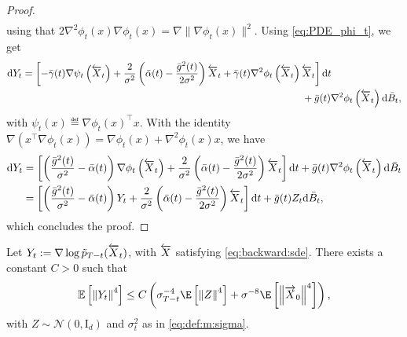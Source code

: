 \documentclass[english,graybox,envcountchap,envcountsame,sectrefs,shortlabels]{svmono}
\theoremstyle{style}
\newcommand{\eqsp}{}
\begin{document}
\begin{proof}
\begin{align*}
\end{align*}
using that $ 2 \nabla^2 \phi_t(x)  \nabla \phi_t(x) = \nabla \| \nabla \phi_t(x) \|^2$. Using \eqref{eq:PDE_phi_t}, we get
\begin{align*}
\rmd  Y_t &=
\left[
    - \bar\gamma(t)\nabla \psi_t\left(\ola X_t\right)  
        + \frac{2}{\sigma^2}\left( \bar \alpha(t) - \frac{\bar g^2(t)}{2 \sigma^2} \right)  \ola X_t
    + \bar\gamma(t) \nabla^2 \phi_t\left(\ola X_t\right) \ola X_t
\right]\rmd t \\
&\qquad\qquad\qquad\qquad\qquad\qquad
\qquad\qquad\qquad\qquad\qquad
\qquad\qquad\qquad+ \bar g(t) \nabla^2 \phi_t\left(\ola X_t\right) \rmd \bar B_t\eqsp,
\end{align*}
with $\psi_t\left(x\right) \eqdef \nabla \phi_t(x)^\top x$. With the identity $\nabla \left( x^\top \nabla \phi_t(x) \right) = \nabla \phi_t (x) + \nabla^2 \phi_t(x) x$, we have
\begin{align*}
\rmd  Y_t &=
\left[
    \left( \frac{\bar g^2(t)}{\sigma^2 } - \bar \alpha(t) \right)\nabla \phi_t\left(\ola X_t\right)
        + \frac{2}{\sigma^2}\left( \bar \alpha(t) - \frac{\bar g^2(t)}{2 \sigma^2} \right)  \ola X_t
\right]\rmd t + \bar g(t) \nabla^2 \phi_t\left(\ola X_t\right) \rmd \bar B_t
\\
&=
\left[
    \left( \frac{\bar g^2(t)}{\sigma^2 } - \bar \alpha(t) \right)Y_t
        + \frac{2}{\sigma^2}\left( \bar \alpha(t) - \frac{\bar g^2(t)}{2 \sigma^2} \right)  \ola X_t
\right]\rmd t + \bar g(t) Z_t \rmd \bar B_t\eqsp,
\end{align*}
which concludes the proof.
\end{proof}


\begin{lemma} \label{score moment bound }
Let $Y_t := \nabla \log \tilde p_{T-t} ( \overleftarrow X_t )$, with $\overleftarrow X$ satisfying \eqref{eq:backward:sde}. There exists a constant $C>0$ such that
\begin{align}\label{eq:moment4_Y}
\mathbb{E} \left[ \left\| Y_t \right\|^4 \right] \leq C \left(
    \sigma_{T-t}^{-4}
    \E\left[\left\| Z \right\|^4\right] + \sigma^{-8} \E\left[\left\| \ora X_0 \right\|^4 \right]
     \right),
\end{align}
with $Z\sim\mathcal{N}(0,\mathrm{I}_d)$ and $\sigma_t^2$ as in \eqref{eq:def:m:sigma}.
\end{lemma}
\end{document}
